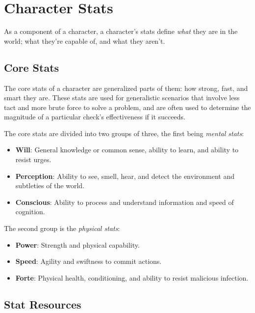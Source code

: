 \documentclass[../main.tex]{subfiles}
\begin{document}
    \section{Character Stats}

        As a component of a character, a character's stats define \emph{what} they are in the world; what they're capable of, and what they aren't.

    \subsection{Core Stats}

        The core stats of a character are generalized parts of them: how strong, fast, and smart they are. These stats are used for generalistic scenarios that involve less tact and more brute force to solve a problem, and are often used to determine the magnitude of a particular check's effectiveness if it succeeds.

        The core stats are divided into two groups of three, the first being \emph{mental stats}:

    \begin{itemize}
        \item \textbf{Will}: General knowledge or common sense, ability to learn, and ability to resist urges. 
        \item \textbf{Perception}: Ability to see, smell, hear, and detect the environment and subtleties of the world.
        \item \textbf{Conscious}: Ability to process and understand information and speed of cognition.
    \end{itemize}

        The second group is the {\em physical stats}:

    \begin{itemize}
        \item \textbf{Power}: Strength and physical capability.
        \item \textbf{Speed}: Agility and swiftness to commit actions.
        \item \textbf{Forte}: Physical health, conditioning, and ability to resist malicious infection.
    \end{itemize}

    \subsection{Stat Resources}
\end{document}
